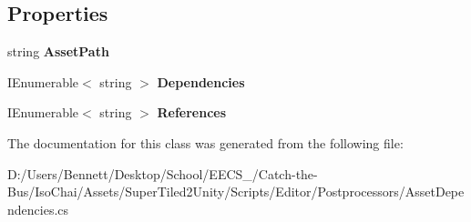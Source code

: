 \subsection*{Properties}
\begin{DoxyCompactItemize}
\item 
\mbox{\label{class_super_tiled2_unity_1_1_editor_1_1_asset_dependencies_ac520a15238660cf9d70dbb7a23d3c287}} 
string {\bfseries Asset\+Path}
\item 
\mbox{\label{class_super_tiled2_unity_1_1_editor_1_1_asset_dependencies_a3edc884de2133b0380494f9927dde026}} 
I\+Enumerable$<$ string $>$ {\bfseries Dependencies}
\item 
\mbox{\label{class_super_tiled2_unity_1_1_editor_1_1_asset_dependencies_a9de1cc25cd1437ebe6c4246d045a7fc2}} 
I\+Enumerable$<$ string $>$ {\bfseries References}
\end{DoxyCompactItemize}


The documentation for this class was generated from the following file\+:\begin{DoxyCompactItemize}
\item 
D\+:/\+Users/\+Bennett/\+Desktop/\+School/\+E\+E\+C\+S\+\_/\+Catch-\/the-\/\+Bus/\+Iso\+Chai/\+Assets/\+Super\+Tiled2\+Unity/\+Scripts/\+Editor/\+Postprocessors/Asset\+Dependencies.\+cs\end{DoxyCompactItemize}
